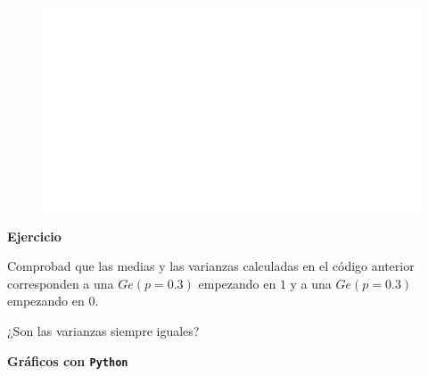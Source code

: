 \documentclass[
  letterpaper,
  DIV=11,
  numbers=noendperiod]{scrreprt}
\begin{document}
\begin{figure}[H]

{\centering \includegraphics{3_files/figure-pdf/py_mean_var_stats-13.pdf}

}

\end{figure}

\textbf{Ejercicio}

Comprobad que las medias y las varianzas calculadas en el código
anterior corresponden a una \(Ge(p=0.3)\) empezando en \(1\) y a una
\(Ge(p=0.3)\) empezando en \(0\).

¿Son las varianzas siempre iguales?

\textbf{Gráficos con \texttt{Python}}
\end{document}
